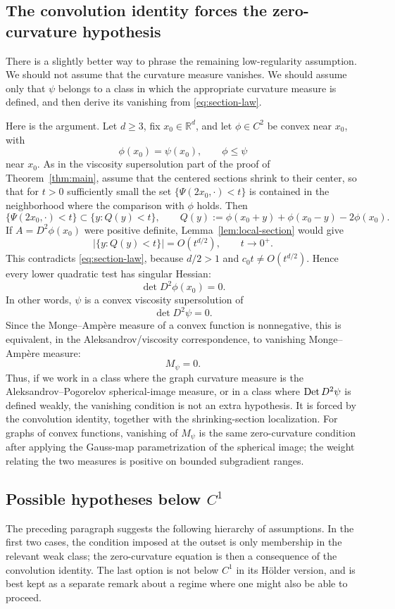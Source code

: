 \documentclass[11pt]{amsart}
\def\R{\mathbb{R}}
\begin{document}
\subsection{The convolution identity forces the zero-curvature hypothesis}
There is a slightly better way to phrase the remaining low-regularity
assumption.  We should not assume that the curvature measure vanishes.  We
should assume only that $\psi$ belongs to a class in which the appropriate
curvature measure is defined, and then derive its vanishing from
\eqref{eq:section-law}.

Here is the argument.  Let $d\geq3$, fix $x_0\in\R^d$, and let
$\phi\in C^2$ be convex near $x_0$, with
\[
    \phi(x_0)=\psi(x_0),\qquad \phi\leq\psi
\]
near $x_0$.  As in the viscosity supersolution part of the proof of
Theorem~\ref{thm:main}, assume that the centered sections shrink to their
center, so that for $t>0$ sufficiently small the set
$\{\Psi(2x_0,\cdot)<t\}$ is contained in the neighborhood where the comparison
with $\phi$ holds.  Then
\[
    \{\Psi(2x_0,\cdot)<t\}
    \subset
    \{y:Q(y)<t\},
    \qquad
    Q(y):=\phi(x_0+y)+\phi(x_0-y)-2\phi(x_0).
\]
If $A=D^2\phi(x_0)$ were positive definite, Lemma~\ref{lem:local-section}
would give
\[
    |\{y:Q(y)<t\}|=O(t^{d/2}),
    \qquad t\to0^+.
\]
This contradicts \eqref{eq:section-law}, because $d/2>1$ and
$c_0t\not=O(t^{d/2})$.  Hence every lower quadratic test has singular Hessian:
\[
    \det D^2\phi(x_0)=0.
\]
In other words, $\psi$ is a convex viscosity supersolution of
\[
    \det D^2\psi=0.
\]
Since the Monge--Ampère measure of a convex function is nonnegative, this is
equivalent, in the Aleksandrov/viscosity correspondence, to vanishing
Monge--Ampère measure:
\[
    M_\psi=0.
\]
Thus, if we work in a class where the graph curvature measure is the
Aleksandrov--Pogorelov spherical-image measure, or in a class where
${\rm Det}\,D^2\psi$ is defined weakly, the vanishing condition is not an extra
hypothesis.  It is forced by the convolution identity, together with the
shrinking-section localization.  For graphs of convex functions, vanishing of
$M_\psi$ is the same zero-curvature condition after applying the Gauss-map
parametrization of the spherical image; the weight relating the two measures is
positive on bounded subgradient ranges.

\subsection{Possible hypotheses below \texorpdfstring{$C^1$}{C1}}
The preceding paragraph suggests the following hierarchy of assumptions.  In
the first two cases, the condition imposed at the outset is only membership in
the relevant weak class; the zero-curvature equation is then a consequence of
the convolution identity.  The last option is not below $C^1$ in its Hölder
version, and is best kept as a separate remark about a regime where one might
also be able to proceed.
\end{document}
